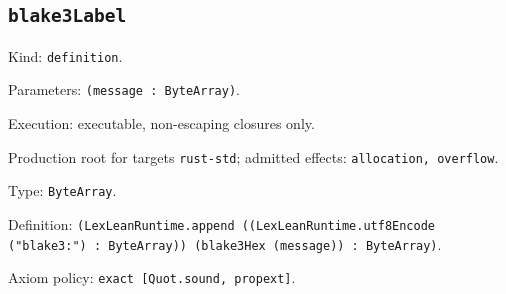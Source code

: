 \documentclass[11pt]{article}
\begin{document}
\subsection*{\texttt{blake3Label}}
\noindent Kind: \texttt{definition}.\par
\noindent Parameters: \texttt{(message : ByteArray)}.\par
\noindent Execution: executable, non-escaping closures only.\par
\noindent Production root for targets \texttt{rust-std}; admitted effects: \texttt{allocation, overflow}.\par
\noindent Type: \texttt{ByteArray}.\par
\noindent Definition: \texttt{(LexLeanRuntime.append ((LexLeanRuntime.utf8Encode ("blake3:") : ByteArray)) (blake3Hex (message)) : ByteArray)}.\par
\noindent Axiom policy: \texttt{exact [Quot.sound, propext]}.\par
\end{document}
